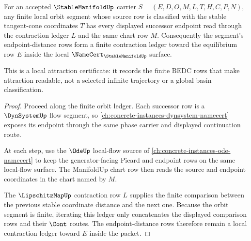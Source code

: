 \begin{theorem}
\label{thm:stable-manifold-local-attraction}
For an accepted $\StableManifoldUp$ carrier
$S=(E,D,O,M,L,T,H,C,P,N)$, any finite local orbit segment whose source row is
classified with the stable tangent-cone coordinates $T$ has every displayed
successor endpoint read through the contraction ledger $L$ and the same
chart row $M$. Consequently the segment's endpoint-distance rows form a
finite contraction ledger toward the equilibrium row $E$ inside the local
$\NameCert_{\StableManifoldUp}$ surface.

This is a local attraction certificate: it records the finite BEDC rows that
make attraction readable, not a selected infinite trajectory or a global basin
classification.
\end{theorem}
\begin{proof}
Proceed along the finite orbit ledger. Each successor row is a
$\DynSystemUp$ flow segment, so
\autoref{ch:concrete-instances-dynsystem-namecert} exposes its endpoint
through the same phase carrier and displayed continuation route.

At each step, use the $\OdeUp$ local-flow source of
\autoref{ch:concrete-instances-ode-namecert} to keep the generator-facing
Picard and endpoint rows on the same local-flow surface. The ManifoldUp chart
row then reads the source and endpoint coordinates in the chart named by $M$.

The $\LipschitzMapUp$ contraction row $L$ supplies the finite comparison
between the previous stable coordinate distance and the next one. Because the
orbit segment is finite, iterating this ledger only concatenates the displayed
comparison rows and their $\Cont$ routes. The endpoint-distance rows therefore
remain a local contraction ledger toward $E$ inside the packet.
\end{proof}


\begin{closurestatus}{\StableManifoldUp}
  \theoryclosure{\seedClosure}
  \formalstatus{\unformalizedV}
\end{closurestatus}
